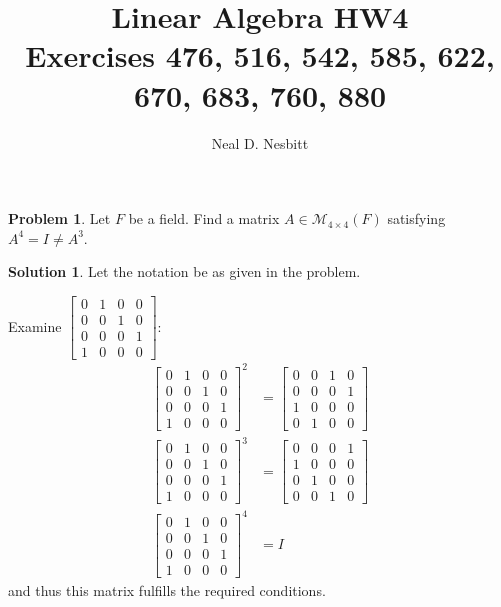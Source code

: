 \documentclass{article}
\title{Linear Algebra HW4\\
Exercises 476, 516, 542, 585, 622, 670, 683, 760, 880}
\author{Neal D. Nesbitt}
\begin{document}
\maketitle

\theoremstyle{definition}
\newtheorem{problem}{Problem}[section]
\newtheorem{solution}{Solution}[problem]
\renewcommand{\thesolution}{\theproblem}

\setcounter{section}{9}
\setcounter{problem}{475}
\begin{problem}
Let $F$ be a field. Find a matrix $A \in \mathcal{M}_{4\times 4}(F)$ satisfying $A^{4}=I\ne A^{3}$.
\end{problem}

\begin{solution}
Let the notation be as given in the problem. 

Examine
$\begin{bmatrix}
0 & 1 & 0 & 0 \\
0 & 0 & 1 & 0 \\
0 & 0 & 0 & 1 \\
1 & 0 & 0 & 0
\end{bmatrix}$:
\begin{align*}
\begin{bmatrix}
0 & 1 & 0 & 0 \\
0 & 0 & 1 & 0 \\
0 & 0 & 0 & 1 \\
1 & 0 & 0 & 0
\end{bmatrix}
^{2}
&=
\begin{bmatrix}
0 & 0 & 1 & 0 \\
0 & 0 & 0 & 1 \\
1 & 0 & 0 & 0 \\
0 & 1 & 0 & 0
\end{bmatrix}\\
\begin{bmatrix}
0 & 1 & 0 & 0 \\
0 & 0 & 1 & 0 \\
0 & 0 & 0 & 1 \\
1 & 0 & 0 & 0
\end{bmatrix}
^{3}
&=
\begin{bmatrix}
0 & 0 & 0 & 1 \\
1 & 0 & 0 & 0 \\
0 & 1 & 0 & 0 \\
0 & 0 & 1 & 0
\end{bmatrix}\\
\begin{bmatrix}
0 & 1 & 0 & 0 \\
0 & 0 & 1 & 0 \\
0 & 0 & 0 & 1 \\
1 & 0 & 0 & 0
\end{bmatrix}
^{4} &= I
\end{align*}
and thus this matrix fulfills the required conditions.
\end{solution}
\end{document}
